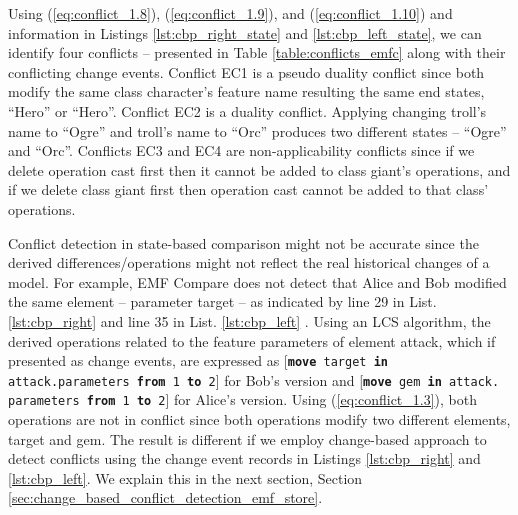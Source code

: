 Using (\ref{eq:conflict_1.8}), (\ref{eq:conflict_1.9}), and (\ref{eq:conflict_1.10}) and information in Listings \ref{lst:cbp_right_state} and \ref{lst:cbp_left_state}, we can identify four conflicts -- presented in Table \ref{table:conflicts_emfc} along with their conflicting change events. Conflict \textsf{EC1} is a pseudo duality conflict since both modify the same class \textsf{character}'s feature \textsf{name} resulting the same end states, ``Hero'' or ``Hero''. Conflict \textsf{EC2} is a duality conflict. Applying changing \textsf{troll}'s \textsf{name} to ``Ogre'' and \textsf{troll}'s \textsf{name} to ``Orc'' produces two different states -- ``Ogre'' and ``Orc''. Conflicts \textsf{EC3} and \textsf{EC4} are non-applicability conflicts since if we delete operation \textsf{cast} first then it cannot be added to class \textsf{giant}'s operations, and if we delete class \textsf{giant} first then operation \textsf{cast} cannot be added to that class' operations.

Conflict detection in state-based comparison might not be accurate since the derived differences/operations might not reflect the real historical changes of a model.
For example, EMF Compare does not detect that Alice and Bob modified the same element -- parameter \textsf{target} -- as indicated by line 29 in List. \ref{lst:cbp_right} and line 35 in List. \ref{lst:cbp_left} . Using an LCS algorithm, the derived operations related to the feature \textsf{parameters} of element \textsf{attack}, which if presented as change events, are expressed as [\texttt{\small \textbf{move} target \textbf{in} attack.parameters \textbf{from} 1 \textbf{to} 2}] for Bob's version and [\texttt{\small \textbf{move} gem \textbf{in} attack. parameters \textbf{from} 1 \textbf{to} 2}] for Alice's version. Using (\ref{eq:conflict_1.3}), both operations are not in conflict since both operations modify two different elements, \textsf{target} and \textsf{gem}. The result is different if we employ change-based approach to detect conflicts using the change event records in Listings \ref{lst:cbp_right} and \ref{lst:cbp_left}. We explain this in the next section, Section \ref{sec:change_based_conflict_detection_emf_store}.


